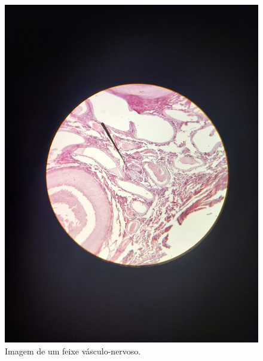 \documentclass[
]{book}
\begin{document}
\begin{figure}
\centering
\includegraphics{images/neuro-feixeneurovasc.jpeg}
\caption{\label{fig:unnamed-chunk-9}Imagem de um feixe vásculo-nervoso.}
\end{figure}
\end{document}
